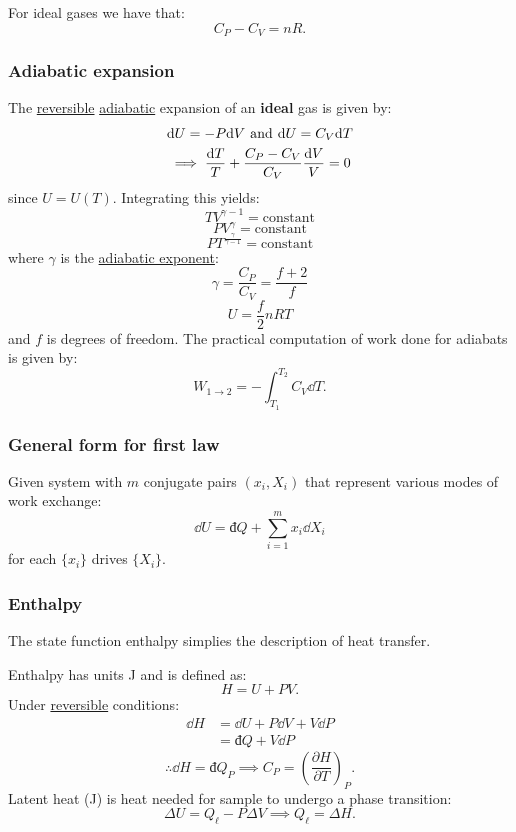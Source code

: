 \documentclass{article}
\newcommand{\idd}{\text{đ}}
\begin{document}
\begin{multicols*}{3}
For ideal gases we have that:
$$C_P-C_V=nR.$$

\subsubsection*{Adiabatic expansion}
The \underline{reversible} \underline{adiabatic}
expansion of an \textbf{ideal} gas is given by:
\begin{align*}
    &\dd U=-P\dd V
    \hspace{0.05in}\text{and}\hspace{0.05in}
    \dd U=C_V\dd T \\
    &\implies
    \frac{\dd T}{T}
    +\frac{C_P-C_V}{C_V}\frac{\dd V}{V}=0
\end{align*}
since $U=U(T)$.
Integrating this yields:
$$TV^{\gamma-1}=\text{constant}$$
$$PV^{\gamma}=\text{constant}$$
$$PT^{\frac{\gamma}{\gamma-1}}=\text{constant}$$
where $\gamma$ is the \underline{adiabatic
exponent}:
$$\gamma=\frac{C_P}{C_V}
=\frac{f+2}{f}$$
$$U=\frac{f}{2}nRT$$
and $f$ is degrees of freedom.
The practical computation of work done
for adiabats is given by:
$$W_{1\rightarrow2}
=-\int_{T_1}^{T_2}C_V\dd T.$$

\subsubsection*{General form for first law}
Given system with $m$ conjugate pairs
$(x_i,X_i)$ that represent various modes
of work exchange:
$$\dd U=\idd Q+
\sum_{i=1}^{m}x_i\dd X_i$$
for each $\{x_i\}$ 
drives $\{X_i\}$.

\columnbreak

\subsubsection*{Enthalpy}
The state function enthalpy simplies the
description of heat transfer. 

Enthalpy has units J
and is defined as:
$$H=U+PV.$$
Under \underline{reversible} conditions:
\begin{align*}
    \dd H
    &=\dd U+P\dd V+V\dd P \\
    &=\idd Q+V\dd P
\end{align*}
$$\therefore\dd H=\idd Q_P
\implies C_P
=\left(\frac{\partial H}{\partial T}\right)_P.$$
Latent heat (J) is heat needed for sample
to undergo a phase transition:
$$\Delta U=Q_{\ell}-P\Delta V
\implies Q_{\ell}=\Delta H.$$


\end{multicols*}
\end{document}
